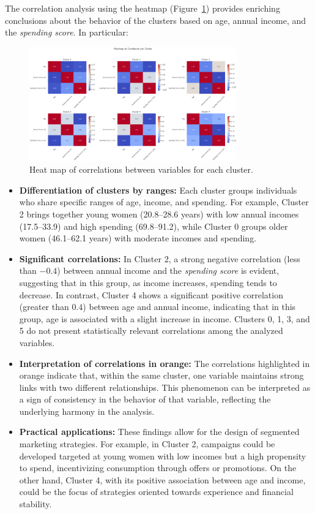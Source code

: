 \documentclass[10pt]{article}
\begin{document}
The correlation analysis using the heatmap (Figure~\ref{fig:miGrafico17}) provides enriching conclusions about the behavior of the clusters based on age, annual income, and the \textit{spending score}. In particular:
\begin{figure}[h]
    \centering
    \includegraphics[width=0.8\textwidth]{plots_investing/Grafico 17.png}
    \caption{Heat map of correlations between variables for each cluster.}
    \label{fig:miGrafico17}
\end{figure}
\begin{itemize}
    \item \textbf{Differentiation of clusters by ranges:} Each cluster groups individuals who share specific ranges of age, income, and spending. For example, Cluster 2 brings together young women (20.8--28.6 years) with low annual incomes (17.5--33.9) and high spending (69.8--91.2), while Cluster 0 groups older women (46.1--62.1 years) with moderate incomes and spending.
    \item \textbf{Significant correlations:} In Cluster 2, a strong negative correlation (less than \(-0.4\)) between annual income and the \textit{spending score} is evident, suggesting that in this group, as income increases, spending tends to decrease. In contrast, Cluster 4 shows a significant positive correlation (greater than \(0.4\)) between age and annual income, indicating that in this group, age is associated with a slight increase in income. Clusters 0, 1, 3, and 5 do not present statistically relevant correlations among the analyzed variables.
    \item \textbf{Interpretation of correlations in orange:} The correlations highlighted in orange indicate that, within the same cluster, one variable maintains strong links with two different relationships. This phenomenon can be interpreted as a sign of consistency in the behavior of that variable, reflecting the underlying harmony in the analysis.
    \item \textbf{Practical applications:} These findings allow for the design of segmented marketing strategies. For example, in Cluster 2, campaigns could be developed targeted at young women with low incomes but a high propensity to spend, incentivizing consumption through offers or promotions. On the other hand, Cluster 4, with its positive association between age and income, could be the focus of strategies oriented towards experience and financial stability.
\end{itemize}
\end{document}
